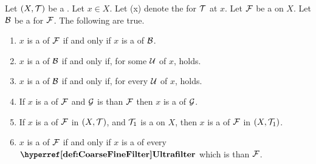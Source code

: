\begin{prop}
\label{prop:FilterConvergenceFacts}
    Let $(X,\mathcal{T})$ be a \TopologicalSpace. 
    Let $x \in X$. 
    Let \NeighborhoodFilterInstance{\scT}(x) denote the 
    \NeighborhoodFilter for $\mathcal{T}$ at $x$. 
    Let $\mathcal{F}$ be a \Filter on $X$. 
    Let $\mathcal{B}$ be a \FilterBase for $\mathcal{F}$. 
    The following are true. 
    \begin{enumerate}[label=(\roman*), ref={\ref{prop:FilterConvergenceFacts}.~\roman*}]
    \item 
    \label{prop:FilterConvergenceFacts:BaseEquivalence}
    $x$ is a \FilterLimit of $\mathcal{F}$ if and only if $x$ is a \FilterLimit of $\mathcal{B}$. 
    \item 
    \label{prop:FilterConvergenceFacts:FundamentalSystemExistence}
    $x$ is a \FilterLimit of $\mathcal{B}$ if and only if, for some 
    \FundamentalSystemOfNeighborhoods $\mathcal{U}$ of $x$, 
    \scNested{\scB}{\scU} holds. 
    \item 
    \label{prop:FilterConvergenceFacts:FundamentalSystemForAll}
    $x$ is a \FilterLimit of $\mathcal{B}$ if and only if, 
    for every 
    \FundamentalSystemOfNeighborhoods $\mathcal{U}$ of $x$, 
    \scNested{\scB}{\scU} holds. 
    \item 
    \label{prop:FilterConvergenceFacts:FinerFilter}
    If $x$ is a \FilterLimit of $\mathcal{F}$ and $\mathcal{G}$ is \FinerFilter
    than $\mathcal{F}$ then $x$ is a \FilterLimit of $\mathcal{G}$. 
    \item 
    \label{prop:FilterConvergenceFacts:CoarserTopology}
    If $x$ is a \FilterLimit of $\mathcal{F}$ in $(X,\mathcal{T})$, and 
    $\mathcal{T}_1$ is a \TopologyCoarser \Topology on $X$, then 
    $x$ is a \FilterLimit of $\mathcal{F}$ in $(X, \mathcal{T}_1)$. 
    \item 
    \label{prop:FilterConvergenceFacts:UltrafilterCondition}
    $x$ is a \FilterLimit of $\mathcal{F}$ if and only if 
    $x$ is a \FilterLimit of every $\UltraFilter$ 
    which is \FinerFilter than $\mathcal{F}$. 
    \end{enumerate}
\end{prop}
